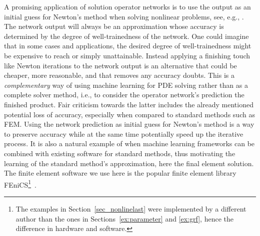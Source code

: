 \documentclass[12pt]{article}
\begin{document}
A promising application of solution operator networks is to use the output as an initial guess for Newton's method when solving nonlinear problems, see, e.g., \cite{huang_int-deep_2020, odot_deepphysics_2022, aghili_accelerating_2024}.
The network output will always be an approximation whose accuracy is determined by the degree of well-trainedness of the network. One could imagine that in some cases and applications, the desired degree of well-trainedness might be expensive to reach or simply unattainable. Instead applying a finishing touch like Newton iterations to the network output is an alternative that could be cheaper, more reasonable, and that removes any accuracy doubts.
This is a \emph{complementary} way of using machine learning for PDE solving rather than as a complete solver method, i.e., to consider the operator network's prediction the finished product. Fair criticism towards the latter includes the already mentioned potential loss of accuracy, especially when compared to standard methods such as FEM. Using the network prediction as initial guess for Newton's method is a way to preserve accuracy while at the same time potentially speed up the iterative process. It is also a natural example of when machine learning frameworks can be combined with existing software for standard methods, thus motivating the learning of the standard method's approximation, here the final element solution. The finite element software we use here is the popular finite element library FEniCS\footnote{\label{fn_hwswdiff} The examples in Section~\ref{sec_nonlinelast} were implemented by a different author than the ones in Sections~\ref{ex:parameter} and \ref{ex:grf}, hence the difference in hardware and software.}~\cite{LoggEtal2012}.
\end{document}
